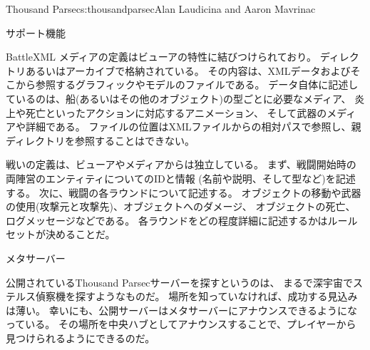 \begin{aosachapter}{Thousand Parsec}{s:thousandparsec}{Alan Laudicina and Aaron Mavrinac}
\begin{aosasect1}{サポート機能}
\begin{aosasect2}{BattleXML}
メディアの定義はビューアの特性に結びつけられており。
ディレクトリあるいはアーカイブで格納されている。
その内容は、XMLデータおよびそこから参照するグラフィックやモデルのファイルである。
データ自体に記述しているのは、船(あるいはその他のオブジェクト)の型ごとに必要なメディア、
炎上や死亡といったアクションに対応するアニメーション、
そして武器のメディアや詳細である。
ファイルの位置はXMLファイルからの相対パスで参照し、親ディレクトリを参照することはできない。

戦いの定義は、ビューアやメディアからは独立している。
まず、戦闘開始時の両陣営のエンティティについてのIDと情報
(名前や説明、そして型など)を記述する。
次に、戦闘の各ラウンドについて記述する。
オブジェクトの移動や武器の使用(攻撃元と攻撃先)、オブジェクトへのダメージ、
オブジェクトの死亡、ログメッセージなどである。
各ラウンドをどの程度詳細に記述するかはルールセットが決めることだ。

\end{aosasect2}

\begin{aosasect2}{メタサーバー}

公開されているThousand Parsecサーバーを探すというのは、
まるで深宇宙でステルス偵察機を探すようなものだ。
場所を知っていなければ、成功する見込みは薄い。
幸いにも、公開サーバーはメタサーバーにアナウンスできるようになっている。
その場所を中央ハブとしてアナウンスすることで、プレイヤーから見つけられるようにできるのだ。


\end{aosasect2}
\end{aosasect1}
\end{aosachapter}

